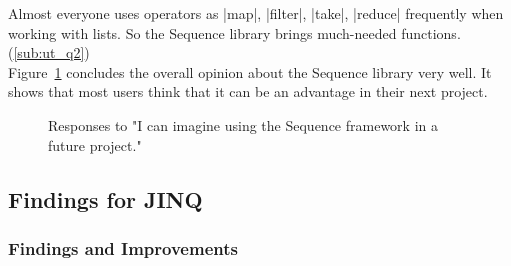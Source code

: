 Almost everyone uses operators as |map|, |filter|, |take|, |reduce|
frequently when working with lists. So the Sequence library brings much-needed
functions. (\ref{sub:ut_q2}) \\ 
Figure~\ref{fig:usertest_q1} concludes the overall opinion about the Sequence
library very well. It shows that most users think that it can be an
advantage in their next project.
\begin{figure}[H]
\caption{Responses to "I can imagine using the Sequence framework in a future project."}
\label{fig:usertest_q1}
\end{figure}
\subsection{Findings for JINQ} %
\label{sub:Findings for JINQ}
\subsubsection{Findings and Improvements} %
\label{subsub:jinq_finding_and_imrpovements}


